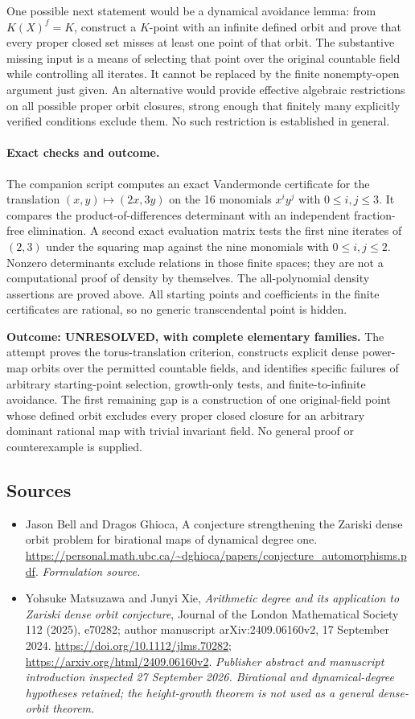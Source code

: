 \documentclass[11pt]{article}
\begin{document}
One possible next statement would be a dynamical avoidance lemma: from
$K(X)^f=K$, construct a $K$-point with an infinite defined orbit and prove
that every proper closed set misses at least one point of that orbit.
The substantive missing input is a means of selecting that point over the
original countable field while controlling all iterates. It cannot be
replaced by the finite nonempty-open argument just given. An alternative
would provide effective algebraic restrictions on all possible proper
orbit closures, strong enough that finitely many explicitly verified
conditions exclude them. No such restriction is established in general.

\paragraph{Exact checks and outcome.}
The companion script computes an exact Vandermonde certificate for the
translation $(x,y)\mapsto(2x,3y)$ on the 16 monomials $x^iy^j$ with
$0\le i,j\le3$. It compares the product-of-differences determinant with
an independent fraction-free elimination. A second exact evaluation
matrix tests the first nine iterates of $(2,3)$ under the squaring map
against the nine monomials with $0\le i,j\le2$. Nonzero determinants
exclude relations in those finite spaces; they are not a computational
proof of density by themselves. The all-polynomial density assertions
are proved above. All starting points and coefficients in the finite
certificates are rational, so no generic transcendental point is hidden.

\textbf{Outcome: UNRESOLVED, with complete elementary families.}
The attempt proves the torus-translation criterion, constructs explicit
dense power-map orbits over the permitted countable fields, and identifies
specific failures of arbitrary starting-point selection, growth-only tests,
and finite-to-infinite avoidance. The first remaining gap is a construction
of one original-field point whose defined orbit excludes every proper
closed closure for an arbitrary dominant rational map with trivial
invariant field. No general proof or counterexample is supplied.

\subsection{Sources}
\begin{itemize}
\item[S1]Jason Bell and Dragos Ghioca, A conjecture strengthening the Zariski dense orbit problem for birational maps of dynamical degree one.
\url{https://personal.math.ubc.ca/~dghioca/papers/conjecture_automorphisms.pdf}.
\textit{Formulation source.}
\item[E1]Yohsuke Matsuzawa and Junyi Xie, \emph{Arithmetic degree
and its application to Zariski dense orbit conjecture}, Journal of the
London Mathematical Society 112 (2025), e70282;
author manuscript arXiv:2409.06160v2, 17 September 2024.
\url{https://doi.org/10.1112/jlms.70282};
\url{https://arxiv.org/html/2409.06160v2}.
\textit{Publisher abstract and manuscript introduction inspected
27 September 2026. Birational and dynamical-degree hypotheses retained;
the height-growth theorem is not used as a general dense-orbit theorem.}
\end{itemize}
\end{document}
